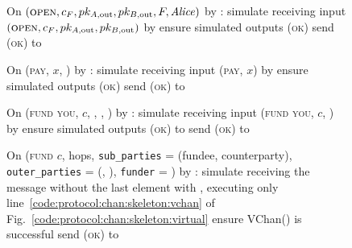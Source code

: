 \begin{figure}[H]
  \begin{simulatorbox}{\simulator}
    \begin{algorithmic}[1]
      \State On $(\textsc{open}, c_F, pk_{A, \mathrm{out}}, pk_{B,
      \mathrm{out}}, F, \mathit{Alice})$ by \fchan:
      \Indent
        \State simulate \alice receiving input $(\textsc{open}, c_F, pk_{A,
        \mathrm{out}}, pk_{B, \mathrm{out}})$ by \environment
        \State ensure simulated \alice outputs (\textsc{ok})
        \State send (\textsc{ok}) to \fchan
      \EndIndent
      \Statex

      \State On (\textsc{pay}, $x$, \dave) by \fchan:
      \Indent
        \State simulate \dave receiving input (\textsc{pay}, $x$) by \environment
        \State ensure simulated \dave outputs (\textsc{ok})
        \State send (\textsc{ok}) to \fchan
      \EndIndent
      \Statex

      \State On (\textsc{fund you}, $c$, \bob, \charlie, \alice) by \fchan:
      \Indent
        \State simulate \alice receiving input (\textsc{fund you}, $c$, \bob) by
        \charlie
        \State ensure simulated \alice outputs (\textsc{ok}) to \charlie
        \State send (\textsc{ok}) to \fchan
      \EndIndent
      \Statex

      \State On (\textsc{fund} $c$, hops, \texttt{sub\_parties} = (fundee,
      counterparty), \texttt{outer\_parties} = (\charlie, \dave),
      \texttt{funder} = \alice) by \fchan:
      \Indent
        \State simulate receiving the message without the last element with
        \alice, executing only line~\ref{code:protocol:chan:skeleton:vchan} of
        Fig.~\ref{code:protocol:chan:skeleton:virtual}
        \State ensure VChan() is successful
        \State send (\textsc{ok}) to \fchan
      \EndIndent
    \end{algorithmic}
  \end{simulatorbox}
  \caption{}
  \label{code:simulator}
\end{figure}
